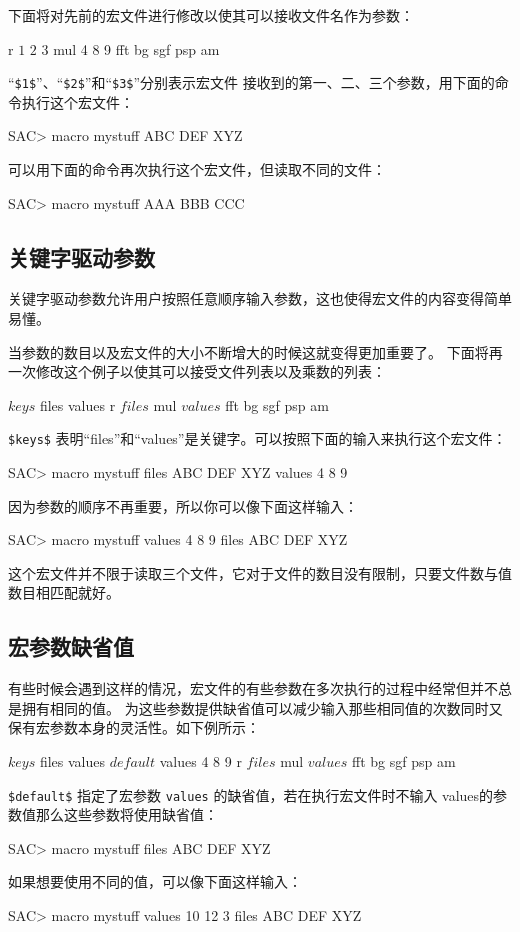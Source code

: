 下面将对先前的宏文件进行修改以使其可以接收文件名作为参数：
\begin{SACCode}
r $1$ $2$ $3$
mul 4 8 9
fft
bg sgf
psp am
\end{SACCode}
``\verb|$1$|''、``\verb|$2$|''和``\verb|$3$|''分别表示宏文件
接收到的第一、二、三个参数，用下面的命令执行这个宏文件：
\begin{SACCode}
SAC> macro mystuff ABC DEF XYZ
\end{SACCode}

可以用下面的命令再次执行这个宏文件，但读取不同的文件：
\begin{SACCode}
SAC> macro mystuff AAA BBB CCC
\end{SACCode}

\subsection{关键字驱动参数}
关键字驱动参数允许用户按照任意顺序输入参数，这也使得宏文件的内容变得简单易懂。

当参数的数目以及宏文件的大小不断增大的时候这就变得更加重要了。
下面将再一次修改这个例子以使其可以接受文件列表以及乘数的列表：
\begin{SACCode}
$keys$ files values
r $files$
mul $values$
fft
bg sgf
psp am
\end{SACCode}
\verb|$keys$| 表明``files''和``values''是关键字。可以按照下面的输入来执行这个宏文件：
\begin{SACCode}
SAC> macro mystuff files ABC DEF XYZ values 4 8 9
\end{SACCode}
因为参数的顺序不再重要，所以你可以像下面这样输入：
\begin{SACCode}
SAC> macro mystuff values 4 8 9 files ABC DEF XYZ
\end{SACCode}
这个宏文件并不限于读取三个文件，它对于文件的数目没有限制，只要文件数与值数目相匹配就好。

\subsection{宏参数缺省值}
有些时候会遇到这样的情况，宏文件的有些参数在多次执行的过程中经常但并不总是拥有相同的值。
为这些参数提供缺省值可以减少输入那些相同值的次数同时又保有宏参数本身的灵活性。如下例所示：
\begin{SACCode}
$keys$ files values
$default$ values 4 8 9
r $files$
mul $values$
fft
bg sgf
psp am
\end{SACCode}
\verb|$default$| 指定了宏参数 \texttt{values} 的缺省值，若在执行宏文件时不输入
values的参数值那么这些参数将使用缺省值：
\begin{SACCode}
SAC> macro mystuff files ABC DEF XYZ
\end{SACCode}
如果想要使用不同的值，可以像下面这样输入：
\begin{SACCode}
SAC> macro mystuff values 10 12 3 files ABC DEF XYZ
\end{SACCode}

